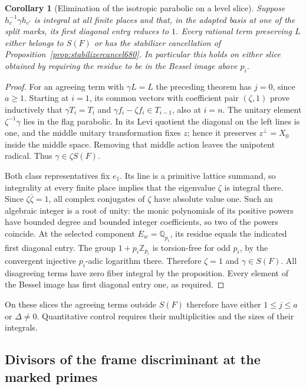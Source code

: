 \documentclass[a4paper,11pt]{article}
\newtheorem{corollary}[proposition]{Corollary}
\theoremstyle{definition}
\theoremstyle{remark}
\numberwithin{equation}{section}
\begin{document}
\begin{corollary}[Elimination of the isotropic parabolic on a level slice]
\leavevmode\label{cor:parabolicslice680}
Suppose \(h_c^{-1}\gamma h_{c'}\) is integral at all finite
places and that, in the adapted basis at one of the split marks,
its first diagonal entry reduces to \(1\). Every rational term
preserving \(L\) either belongs to \(S(F)\) or has the
stabilizer cancellation of Proposition~\ref{prop:stabilizercancel680}.
In particular this holds on either slice obtained by requiring
the residue to be in the Bessel image above \(p_i\).
\end{corollary}
\begin{proof}
For an agreeing term with \(\gamma L=L\) the preceding theorem
has \(j=0\), since \(a\ge1\). Starting at \(i=1\), its common
vectors with coefficient pair \((\zeta,1)\) prove inductively
that \(\gamma T_i=T_i\) and \(\gamma f_i-\zeta f_i\in T_{i-1}\),
also at \(i=n\). The unitary element \(\zeta^{-1}\gamma\) lies
in the flag parabolic. In its Levi quotient the diagonal on the
left lines is one, and the middle unitary transformation fixes
\(z\); hence it preserves \(z^\perp=X_0\) inside the middle
space. Removing that middle action leaves the unipotent radical.
Thus \(\gamma\in\zeta S(F)\).

Both class representatives fix \(e_1\). Its line is a primitive
lattice summand, so integrality at every finite place implies
that the eigenvalue \(\zeta\) is integral there. Since
\(\zeta\bar\zeta=1\), all complex conjugates of \(\zeta\) have
absolute value one. Such an algebraic integer is a root of
unity: the monic polynomials of its positive powers have bounded
degree and bounded integer coefficients, so two of the powers
coincide. At the selected component \(E_w=\mathbb Q_{p_i}\),
its residue equals the indicated first diagonal entry. The group
\(1+p_i\mathbb Z_{p_i}\) is torsion-free for odd \(p_i\), by
the convergent injective \(p_i\)-adic logarithm there. Therefore
\(\zeta=1\) and \(\gamma\in S(F)\). All disagreeing terms have
zero fiber integral by the proposition. Every element of the
Bessel image has first diagonal entry one, as required.
\end{proof}

On these slices the agreeing terms outside \(S(F)\) therefore
have either \(1\le j\le a\) or \(\Delta\ne0\). Quantitative control
requires their multiplicities and the sizes of their integrals.


\subsection{Divisors of the frame discriminant at the marked primes}
\label{sec:discriminant681}
\end{document}
